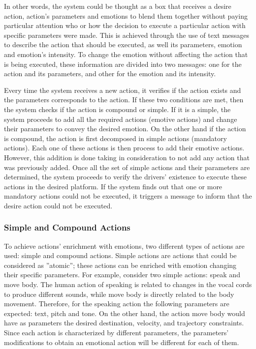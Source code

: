 In other words, the system could be thought as a box that receives a desire action, action's parameters and emotions to blend them together without paying particular attention who or how the decision to execute a particular action with specific parameters were made. This is achieved through the use of text messages to describe the action that should be executed, as well its parameters, emotion and emotion's intensity.  To change the emotion without affecting the action that is being executed, these information are divided into two messages: one for the action and its parameters, and other for the emotion and its intensity.

Every time the system receives a new action, it verifies if the action exists and the parameters corresponds to the action. If these two conditions are met, then the system checks if the action is compound or simple. If it is a simple, the system proceeds to add all the required actions (emotive actions) and change their parameters to convey the desired emotion. On the other hand if the action is compound, the action is first decomposed in simple actions (mandatory actions). Each one of these actions is then process to add their emotive actions. However, this addition is done taking in consideration to not add any action that was previously added. Once all the set of simple actions and their parameters are determined, the system proceeds to verify the drivers' existence to execute these actions in the desired platform. If the system finds out that one or more mandatory actions could not be executed, it triggers a message to inform that the desire action could not be executed. 

\subsubsection{Simple and Compound Actions}
To achieve actions' enrichment with emotions, two different types of actions are used: simple and compound actions. Simple actions are actions that could be considered as ''atomic''; these actions can be enriched with emotion changing their specific parameters. For example, consider two simple actions: speak and move body. The human action of speaking is related to changes in the vocal cords to produce different sounds, while move body is directly related to the body movement. Therefore, for the speaking action the following parameters are expected: text, pitch and tone. On the other hand, the action move body would have as parameters the desired destination, velocity, and trajectory constraints. Since each action is characterized by different parameters, the parameters' modifications to obtain an emotional action will be different for each of them.

